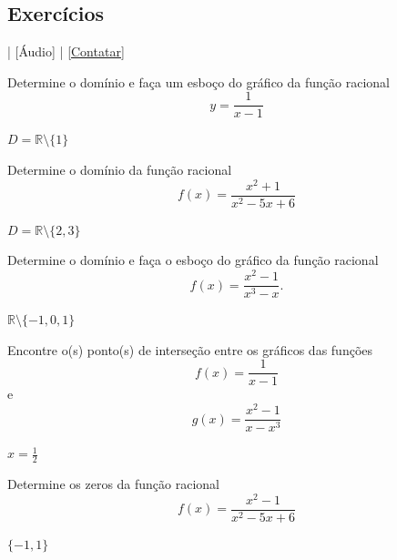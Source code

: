 \subsection*{Exercícios}

\begin{flushright}
  [Vídeo] | [Áudio] | \href{https://phkonzen.github.io/notas/contato.html}{[Contatar]}
\end{flushright}

\begin{exer}
  Determine o domínio e faça um esboço do gráfico da função racional
  \begin{equation}
    y = \frac{1}{x-1}
  \end{equation}
\end{exer}
\begin{resp}
  $D=\mathbb{R}\setminus\{1\}$
\end{resp}

\begin{exer}
  Determine o domínio da função racional
  \begin{equation}
    f(x) = \frac{x^2+1}{x^2-5x+6}
  \end{equation}
\end{exer}
\begin{resp}
  $D=\mathbb{R}\setminus\{2,3\}$
\end{resp}

\begin{exer}
  Determine o domínio e faça o esboço do gráfico da função racional
  \begin{equation}
    f(x) = \frac{x^2-1}{x^3-x}.
  \end{equation}
\end{exer}
\begin{resp}
  $\mathbb{R}\setminus\{-1,0,1\}$
\end{resp}

\begin{exer}
  Encontre o(s) ponto(s) de interseção entre os gráficos das funções
  \begin{equation}
    f(x) = \frac{1}{x-1}
  \end{equation}
  e
  \begin{equation}
    g(x) = \frac{x^2-1}{x-x^3}
  \end{equation}
\end{exer}
\begin{resp}
  $x=\frac{1}{2}$
\end{resp}

\begin{exer}
  Determine os zeros da função racional
  \begin{equation}
    f(x) = \frac{x^2-1}{x^2-5x+6}
  \end{equation}
\end{exer}
\begin{resp}
  $\{-1,1\}$
\end{resp}


